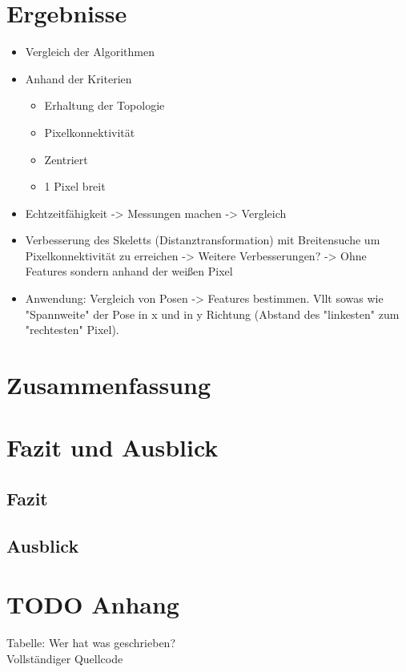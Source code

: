\documentclass[appendixprefix,a4paper,bibliography=totoc,twoside=true,11pt,DIV=11,BCOR=6mm,headsepline,pointlessnumbers]{scrbook}
\begin{document}
\chapter{Ergebnisse}
\begin{itemize}
	\item Vergleich der Algorithmen
	\item Anhand der Kriterien
	\begin{itemize}
		\item Erhaltung der Topologie
		\item Pixelkonnektivität
		\item Zentriert
		\item 1 Pixel breit
	\end{itemize}
	\item Echtzeitfähigkeit -> Messungen machen -> Vergleich
	\item Verbesserung des Skeletts (Distanztransformation) mit Breitensuche um Pixelkonnektivität zu erreichen -> Weitere Verbesserungen? -> Ohne Features sondern anhand der weißen Pixel
	\item Anwendung: Vergleich von Posen -> Features bestimmen. Vllt sowas wie "Spannweite" der Pose in x und in y Richtung (Abstand des "linkesten" zum "rechtesten" Pixel). 
\end{itemize}
\chapter{Zusammenfassung}
\chapter{Fazit und Ausblick}
\section{Fazit}
\section{Ausblick}
\chapter{TODO Anhang}
Tabelle: Wer hat was geschrieben?\\
Vollständiger Quellcode
\end{document}
